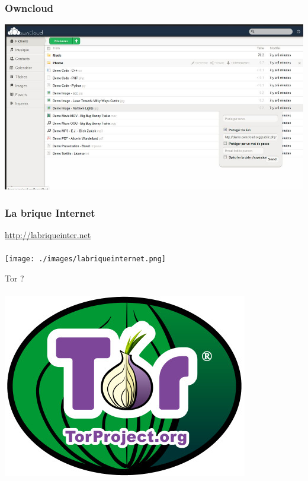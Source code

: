 \documentclass{beamer}
\begin{document}
\begin{frame}
\begin{center}
\frametitle{Owncloud}
\includegraphics[scale=0.6] {./images/owncloud.jpg}
\end{center}
\end{frame}
\begin{frame}
\begin{center}
\frametitle{La brique Internet}
\url{http://labriqueinter.net}
\\~\\
\texttt{[image: ./images/labriqueinternet.png]}
\end{center}
\end{frame}

\begin{frame}
\begin{center}
\Huge{Tor ? }
\\~\\ \includegraphics[scale=0.4]{./images/logo_tor.jpg}
\end{center}
\end{frame}
\end{document}
